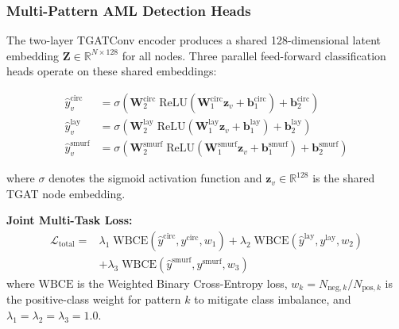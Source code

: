 \subsubsection{Multi-Pattern AML Detection Heads}
\label{subsubsec:pattern_heads}

The two-layer TGATConv encoder produces a shared 128-dimensional latent embedding $\mathbf{Z} \in \mathbb{R}^{N \times 128}$ for all nodes. Three parallel feed-forward classification heads operate on these shared embeddings:

\begin{align}
\hat{y}^{\text{circ}}_v &= \sigma\!\left( \mathbf{W}^{\text{circ}}_2 \;\text{ReLU}\!\left(\mathbf{W}^{\text{circ}}_1 \mathbf{z}_v + \mathbf{b}^{\text{circ}}_1\right) + \mathbf{b}^{\text{circ}}_2 \right) \label{eq:circ_head} \\
\hat{y}^{\text{lay}}_v &= \sigma\!\left( \mathbf{W}^{\text{lay}}_2 \;\text{ReLU}\!\left(\mathbf{W}^{\text{lay}}_1 \mathbf{z}_v + \mathbf{b}^{\text{lay}}_1\right) + \mathbf{b}^{\text{lay}}_2 \right) \label{eq:lay_head} \\
\hat{y}^{\text{smurf}}_v &= \sigma\!\left( \mathbf{W}^{\text{smurf}}_2 \;\text{ReLU}\!\left(\mathbf{W}^{\text{smurf}}_1 \mathbf{z}_v + \mathbf{b}^{\text{smurf}}_1\right) + \mathbf{b}^{\text{smurf}}_2 \right) \label{eq:smurf_head}
\end{align}

where $\sigma$ denotes the sigmoid activation function and $\mathbf{z}_v \in \mathbb{R}^{128}$ is the shared TGAT node embedding.

\vspace{0.5em}
\noindent \textbf{Joint Multi-Task Loss:}
\begin{equation}
\begin{split}
\mathcal{L}_{\text{total}} = {} & \lambda_1 \;\text{WBCE}(\hat{y}^{\text{circ}}, y^{\text{circ}}, w_1) + \lambda_2 \;\text{WBCE}(\hat{y}^{\text{lay}}, y^{\text{lay}}, w_2) \\
& + \lambda_3 \;\text{WBCE}(\hat{y}^{\text{smurf}}, y^{\text{smurf}}, w_3)
\end{split}
\label{eq:joint_loss}
\end{equation}
where $\text{WBCE}$ is the Weighted Binary Cross-Entropy loss, $w_k = N_{\text{neg},k} / N_{\text{pos},k}$ is the positive-class weight for pattern $k$ to mitigate class imbalance, and $\lambda_1 = \lambda_2 = \lambda_3 = 1.0$.

